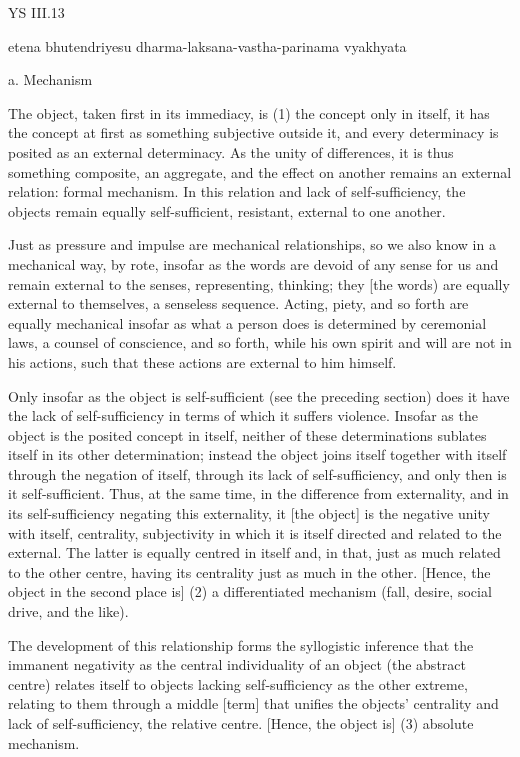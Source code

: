YS III.13

etena bhutendriyesu dharma-laksana-vastha-parinama vyakhyata

a. Mechanism

The object, taken first in its immediacy, is
(1) the concept only in itself, it has the concept at first as something
subjective outside it, and every determinacy is posited as an external determinacy.
As the unity of differences, it is thus something composite, an aggregate,
and the effect on another remains an external relation: formal mechanism.
In this relation and lack of self-sufficiency, the objects remain equally
self-sufficient, resistant, external to one another.

    Just as pressure and impulse are mechanical relationships, so we also
    know in a mechanical way, by rote, insofar as
    the words are devoid of any sense for us and remain external to the
    senses, representing, thinking; they [the words) are equally external
    to themselves, a senseless sequence. Acting, piety, and so forth are
    equally mechanical insofar as what a person does is determined by
    ceremonial laws, a counsel of conscience, and so forth, while his own
    spirit and will are not in his actions, such that these actions are
    external to him himself.

Only insofar as the object is self-sufficient (see the preceding section)
does it have the lack of self-sufficiency in terms of which it suffers violence.
Insofar as the object is the posited concept in itself, neither of these
determinations sublates itself in its other determination;
instead the object joins itself together with itself
through the negation of itself, through its lack of self-sufficiency,
and only then is it self-sufficient.
Thus, at the same time, in the difference from externality,
and in its self-sufficiency negating this externality,
it [the object] is the negative unity with itself, centrality,
subjectivity in which it is itself directed and related to the external.
The latter is equally centred in itself and, in that, just as much related
to the other centre, having its centrality just as much in the other.
[Hence, the object in the second place is]
(2) a differentiated mechanism (fall, desire, social drive, and the like).

The development of this relationship forms the syllogistic inference that the
immanent negativity as the central individuality of an object (the abstract centre)
relates itself to objects lacking self-sufficiency as the other extreme,
relating to them through a middle [term] that unifies the objects' centrality
and lack of self-sufficiency, the relative centre.
[Hence, the object is]
(3) absolute mechanism.

